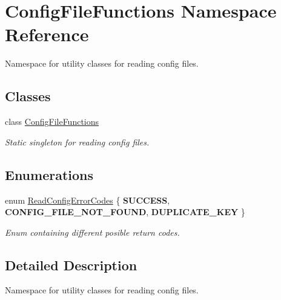 \hypertarget{namespace_config_file_functions}{}\section{Config\+File\+Functions Namespace Reference}
\label{namespace_config_file_functions}


Namespace for utility classes for reading config files.  


\subsection*{Classes}
\begin{DoxyCompactItemize}
\item 
class \mbox{\hyperlink{class_config_file_functions_1_1_config_file_functions}{Config\+File\+Functions}}
\begin{DoxyCompactList}\small\item\em Static singleton for reading config files. \end{DoxyCompactList}\end{DoxyCompactItemize}
\subsection*{Enumerations}
\begin{DoxyCompactItemize}
\item 
\mbox{\label{namespace_config_file_functions_aa7fab72913bf30fd480cb3d7dbf47518}} 
enum \mbox{\hyperlink{namespace_config_file_functions_aa7fab72913bf30fd480cb3d7dbf47518}{Read\+Config\+Error\+Codes}} \{ {\bfseries S\+U\+C\+C\+E\+SS}, 
{\bfseries C\+O\+N\+F\+I\+G\+\_\+\+F\+I\+L\+E\+\_\+\+N\+O\+T\+\_\+\+F\+O\+U\+ND}, 
{\bfseries D\+U\+P\+L\+I\+C\+A\+T\+E\+\_\+\+K\+EY}
 \}
\begin{DoxyCompactList}\small\item\em Enum containing different posible return codes. \end{DoxyCompactList}\end{DoxyCompactItemize}


\subsection{Detailed Description}
Namespace for utility classes for reading config files. 